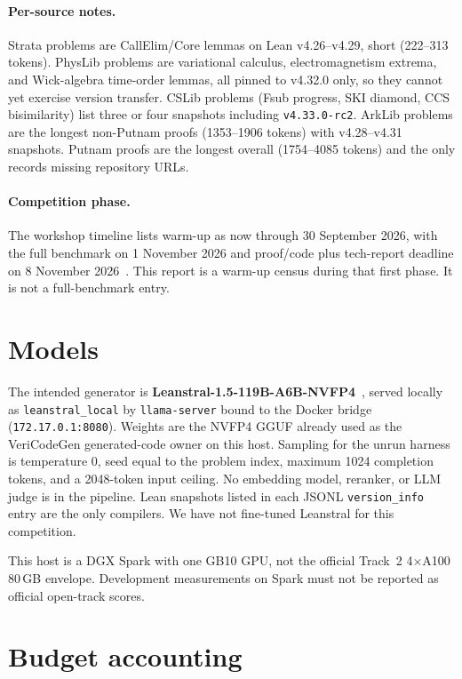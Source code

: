 \documentclass{article}
\begin{document}
\paragraph{Per-source notes.} Strata problems are CallElim/Core lemmas on Lean v4.26--v4.29, short (222--313 tokens). PhysLib problems are variational calculus, electromagnetism extrema, and Wick-algebra time-order lemmas, all pinned to v4.32.0 only, so they cannot yet exercise version transfer. CSLib problems (Fsub progress, SKI diamond, CCS bisimilarity) list three or four snapshots including \texttt{v4.33.0-rc2}. ArkLib problems are the longest non-Putnam proofs (1353--1906 tokens) with v4.28--v4.31 snapshots. Putnam proofs are the longest overall (1754--4085 tokens) and the only records missing repository URLs.

\paragraph{Competition phase.} The workshop timeline lists warm-up as now through 30 September 2026, with the full benchmark on 1 November 2026 and proof/code plus tech-report deadline on 8 November 2026~\cite{vericodegen2026}. This report is a warm-up census during that first phase. It is not a full-benchmark entry.

\section{Models}

The intended generator is \textbf{Leanstral-1.5-119B-A6B-NVFP4}~\cite{leanstral}, served locally as \texttt{leanstral\_local} by \texttt{llama-server} bound to the Docker bridge (\texttt{172.17.0.1:8080}). Weights are the NVFP4 GGUF already used as the VeriCodeGen generated-code owner on this host. Sampling for the unrun harness is temperature 0, seed equal to the problem index, maximum 1024 completion tokens, and a 2048-token input ceiling. No embedding model, reranker, or LLM judge is in the pipeline. Lean snapshots listed in each JSONL \texttt{version\_info} entry are the only compilers. We have not fine-tuned Leanstral for this competition.

This host is a DGX Spark with one GB10 GPU, not the official Track~2 4$\times$A100 80\,GB envelope. Development measurements on Spark must not be reported as official open-track scores.

\section{Budget accounting}
\label{budget}
\end{document}
